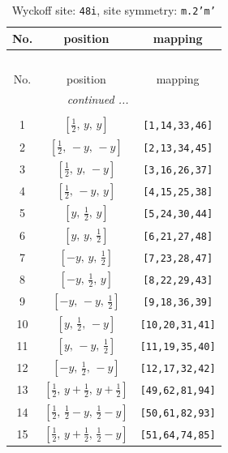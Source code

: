 \documentclass[fleqn,8pt]{jsarticle}
\begin{document}
\begin{longtable}{ccc}
\caption{Wyckoff site: {\tt 48i}, site symmetry: {\tt m.2'm'}}
 \\
 \hline \hline
No. & position & mapping \\ \hline \endfirsthead

\multicolumn{2}{l}{\tablename\ \thetable{}} \\
 \hline \hline
No. & position & mapping \\ \hline \endhead

 \hline \hline
\multicolumn{2}{r}{\footnotesize\it continued ...} \\ \endfoot

 \hline \hline
\multicolumn{2}{r}{} \\ \endlastfoot

1 & $\left[ \frac{1}{2},\, y,\, y \right]$ & {\tt [1,14,33,46]} \\ \hline
2 & $\left[ \frac{1}{2},\, - y,\, - y \right]$ & {\tt [2,13,34,45]} \\ \hline
3 & $\left[ \frac{1}{2},\, y,\, - y \right]$ & {\tt [3,16,26,37]} \\ \hline
4 & $\left[ \frac{1}{2},\, - y,\, y \right]$ & {\tt [4,15,25,38]} \\ \hline
5 & $\left[ y,\, \frac{1}{2},\, y \right]$ & {\tt [5,24,30,44]} \\ \hline
6 & $\left[ y,\, y,\, \frac{1}{2} \right]$ & {\tt [6,21,27,48]} \\ \hline
7 & $\left[ - y,\, y,\, \frac{1}{2} \right]$ & {\tt [7,23,28,47]} \\ \hline
8 & $\left[ - y,\, \frac{1}{2},\, y \right]$ & {\tt [8,22,29,43]} \\ \hline
9 & $\left[ - y,\, - y,\, \frac{1}{2} \right]$ & {\tt [9,18,36,39]} \\ \hline
10 & $\left[ y,\, \frac{1}{2},\, - y \right]$ & {\tt [10,20,31,41]} \\ \hline
11 & $\left[ y,\, - y,\, \frac{1}{2} \right]$ & {\tt [11,19,35,40]} \\ \hline
12 & $\left[ - y,\, \frac{1}{2},\, - y \right]$ & {\tt [12,17,32,42]} \\ \hline
13 & $\left[ \frac{1}{2},\, y + \frac{1}{2},\, y + \frac{1}{2} \right]$ & {\tt [49,62,81,94]} \\ \hline
14 & $\left[ \frac{1}{2},\, \frac{1}{2} - y,\, \frac{1}{2} - y \right]$ & {\tt [50,61,82,93]} \\ \hline
15 & $\left[ \frac{1}{2},\, y + \frac{1}{2},\, \frac{1}{2} - y \right]$ & {\tt [51,64,74,85]} \\ \hline

\end{longtable}
\end{document}
